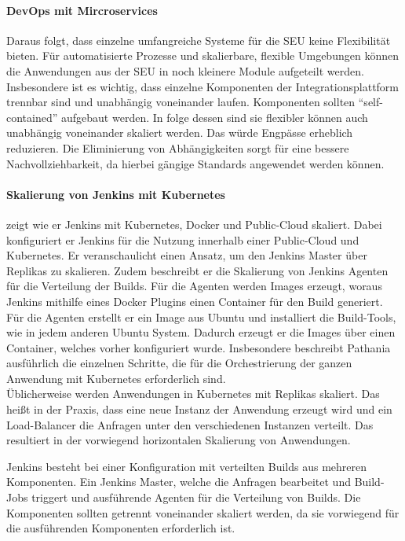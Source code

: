 \paragraph{DevOps mit Mircroservices}
Daraus folgt, dass einzelne umfangreiche Systeme für die \ac{SEU} keine Flexibilität bieten. Für automatisierte Prozesse und skalierbare, flexible Umgebungen können die Anwendungen aus der \ac{SEU} in noch kleinere Module aufgeteilt werden. Insbesondere ist es wichtig, dass einzelne Komponenten der Integrationsplattform trennbar sind und unabhängig voneinander laufen. Komponenten sollten \enquote{self-contained} aufgebaut werden. In folge dessen sind sie flexibler können auch unabhängig voneinander skaliert werden. Das würde Engpässe erheblich reduzieren. Die Eliminierung von Abhängigkeiten sorgt für eine bessere Nachvollziehbarkeit, da hierbei gängige Standards angewendet werden können.

\paragraph{Skalierung von Jenkins mit Kubernetes}
\label{jenkins:skalierung}
\citet{Pathania2017} zeigt wie er Jenkins mit Kubernetes, Docker und Public-Cloud skaliert. Dabei konfiguriert er Jenkins für die Nutzung innerhalb einer Public-Cloud und Kubernetes. Er veranschaulicht einen Ansatz, um den Jenkins Master über Replikas zu skalieren. Zudem beschreibt er die Skalierung von Jenkins Agenten für die Verteilung der Builds. Für die Agenten werden Images erzeugt, woraus Jenkins mithilfe eines Docker Plugins einen Container für den Build generiert. Für die Agenten erstellt er ein Image aus Ubuntu und installiert die Build-Tools, wie in jedem anderen Ubuntu System.
Dadurch erzeugt er die Images über einen Container, welches vorher konfiguriert wurde. Insbesondere beschreibt Pathania ausführlich die einzelnen Schritte, die für die Orchestrierung der ganzen Anwendung mit Kubernetes erforderlich sind.
\medskip
\\
Üblicherweise werden Anwendungen in Kubernetes mit Replikas skaliert. Das heißt in der Praxis, dass eine neue Instanz der Anwendung erzeugt wird und ein Load-Balancer die Anfragen unter den verschiedenen Instanzen verteilt. Das resultiert in der vorwiegend horizontalen Skalierung von Anwendungen. 

Jenkins besteht bei einer Konfiguration mit verteilten Builds aus mehreren Komponenten. Ein Jenkins Master, welche die Anfragen bearbeitet und Build-Jobs triggert und ausführende Agenten für die Verteilung von Builds. Die Komponenten sollten getrennt voneinander skaliert werden, da sie vorwiegend für die ausführenden Komponenten erforderlich ist. 

